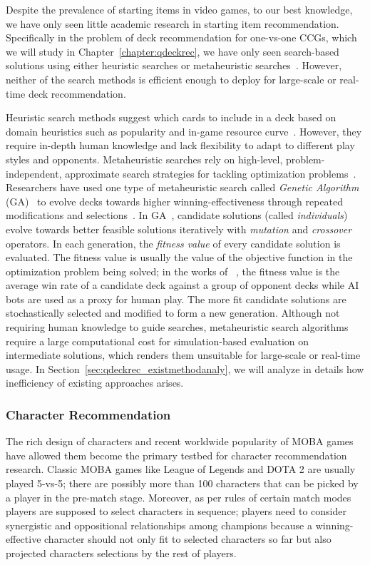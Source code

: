 Despite the prevalence of starting items in video games, to our best knowledge, we have only seen little academic research in starting item recommendation. Specifically in the problem of deck recommendation for one-vs-one CCGs, which we will study in Chapter~\ref{chapter:qdeckrec}, we have only seen search-based solutions using either heuristic searches or metaheuristic searches~\cite{birattari2009tuning}. However, neither of the search methods is efficient enough to deploy for large-scale or real-time deck recommendation. 

Heuristic search methods suggest which cards to include in a deck based on domain heuristics such as popularity and in-game resource curve~\cite{frankkarsten,willfancher,stiegler2016hearthstone}. However, they require in-depth human knowledge and lack flexibility to adapt to different play styles and opponents. Metaheuristic searches rely on high-level, problem-independent, approximate search strategies for tackling optimization problems~\cite{birattari2009tuning}. Researchers have used one type of metaheuristic search called \textit{Genetic Algorithm} (GA)~\cite{holland1992adaptation} to evolve decks towards higher winning-effectiveness through repeated modifications and selections~\cite{garcia2016evolutionary,bjorke2017deckbuilding}. In GA~\cite{holland1992adaptation}, candidate solutions (called \textit{individuals}) evolve towards better feasible solutions iteratively with \textit{mutation} and \textit{crossover} operators. In each generation, the \textit{fitness value} of every candidate solution is evaluated. The fitness value is usually the value of the objective function in the optimization problem being solved; in the works of ~\cite{garcia2016evolutionary,bjorke2017deckbuilding}, the fitness value is the average win rate of a candidate deck against a group of opponent decks while AI bots are used as a proxy for human play. The more fit candidate solutions are stochastically selected and modified to form a new generation. Although not requiring human knowledge to guide searches, metaheuristic search algorithms require a large computational cost for simulation-based evaluation on intermediate solutions, which renders them unsuitable for large-scale or real-time usage. In Section~\ref{sec:qdeckrec_existmethodanaly}, we will analyze in details how inefficiency of existing approaches arises. 

\subsubsection{Character Recommendation}\label{sec:rw_character}
The rich design of characters and recent worldwide popularity of MOBA games have allowed them become the primary testbed for character recommendation research. Classic MOBA games like League of Legends and DOTA 2 are usually played 5-vs-5; there are possibly more than 100 characters that can be picked by a player in the pre-match stage. Moreover, as per rules of certain match modes players are supposed to select characters in sequence; players need to consider synergistic and oppositional relationships among champions because a winning-effective character should not only fit to selected characters so far but also projected characters selections by the rest of players. 


